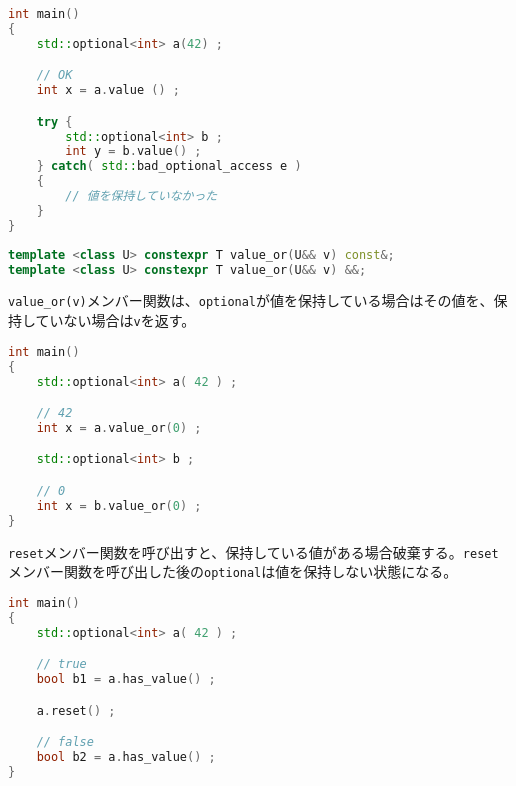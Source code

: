 \begin{lstlisting}[language=C++]
int main()
{
    std::optional<int> a(42) ;

    // OK
    int x = a.value () ;

    try {
        std::optional<int> b ;
        int y = b.value() ;
    } catch( std::bad_optional_access e )
    {
        // 値を保持していなかった
    }
}
\end{lstlisting}

%

\bgroup
\begin{lstlisting}[language=C++]
template <class U> constexpr T value_or(U&& v) const&;
template <class U> constexpr T value_or(U&& v) &&;
\end{lstlisting}
\egroup

\lstinline!value_or(v)!メンバー関数は、\lstinline!optional!が値を保持している場合はその値を、保持していない場合は\lstinline!v!を返す。

\begin{lstlisting}[language=C++]
int main()
{
    std::optional<int> a( 42 ) ;

    // 42
    int x = a.value_or(0) ;

    std::optional<int> b ;

    // 0
    int x = b.value_or(0) ;
}
\end{lstlisting}

%

\lstinline!reset!メンバー関数を呼び出すと、保持している値がある場合破棄する。\lstinline!reset!メンバー関数を呼び出した後の\lstinline!optional!は値を保持しない状態になる。

\begin{lstlisting}[language=C++]
int main()
{
    std::optional<int> a( 42 ) ;

    // true
    bool b1 = a.has_value() ;

    a.reset() ;

    // false
    bool b2 = a.has_value() ;
}
\end{lstlisting}

%

